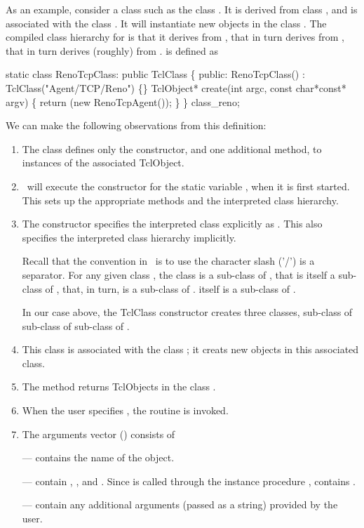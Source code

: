 As an example, consider a class such as the
class .
It is derived from class , and
is associated with the class .
It will instantiate new objects in the class .
The compiled class hierarchy for  is that
it derives from , that in turn derives from ,
that in turn derives (roughly) from .
 is defined as
\begin{program}
        static class RenoTcpClass: public TclClass \{
        public:
                RenoTcpClass() : TclClass("Agent/TCP/Reno") \{\}
                TclObject* create(int argc, const char*const* argv) \{
                        return (new RenoTcpAgent());
                \}
        \} class_reno;
\end{program}
We can make the following observations from this definition:
\begin{enumerate}
\item The class defines only the constructor, and one additional method,
  to  instances of the associated TclObject.
\item \ns\ will execute the  constructor
  for the static variable , when it is first started.
  This sets up the appropriate methods and the interpreted class hierarchy.
\item The constructor specifies the interpreted class explicitly as
  .  This also specifies the interpreted class
  hierarchy implicitly.

  Recall that the convention in \ns\ is to use
  the character slash ('/') is a separator.
  For any given class ,
  the class  is a sub-class of ,
  that is itself a sub-class of ,
  that, in turn, is a sub-class of .
   itself is a sub-class of .

  In our case above, the TclClass constructor creates three classes,
   sub-class of 
  sub-class of  sub-class of .
\item This class is associated with the class ;
  it creats new objects in this associated class.
\item The  method returns TclObjects in the
  class .
\item When the user specifies ,
  the routine  is invoked.
\item The arguments vector () consists of

  ---  contains the name of the object.

  ---  contain
  , , and .
  Since  is called
  through the instance procedure ,
   contains .

  --- 
  contain any additional arguments (passed as a string) provided by the user.
\end{enumerate}
